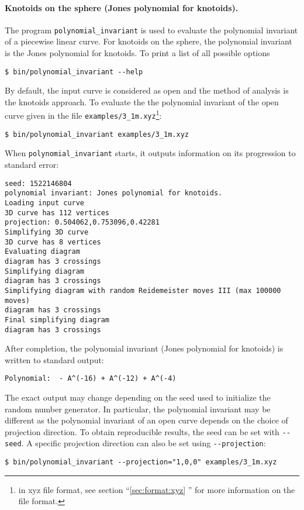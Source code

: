 \paragraph{Knotoids on the sphere (Jones polynomial for knotoids).}
The program \lstinline{polynomial_invariant} is used to evaluate the polynomial invariant of a piecewise linear curve. For knotoids on the sphere, the polynomial invariant is the Jones polynomial for knotoids. To print a list of all possible options
\begin{lstlisting}
$ bin/polynomial_invariant --help
\end{lstlisting}
By default, the input curve is considered as open and the method of analysis is the knotoids approach. To evaluate the the polynomial invariant of the open curve given in the file \lstinline{examples/3_1m.xyz}\footnote{in xyz file format, see section ``\ref{sec:format:xyz} '' for more information on the file format.}:
\begin{lstlisting}
$ bin/polynomial_invariant examples/3_1m.xyz
\end{lstlisting}
When \lstinline{polynomial_invariant} starts, it outputs information on its progression to standard error:
\begin{lstlisting}
seed: 1522146804
polynomial invariant: Jones polynomial for knotoids.
Loading input curve
3D curve has 112 vertices
projection: 0.504062,0.753096,0.42281
Simplifying 3D curve
3D curve has 8 vertices
Evaluating diagram
diagram has 3 crossings
Simplifying diagram
diagram has 3 crossings
Simplifying diagram with random Reidemeister moves III (max 100000 moves)
diagram has 3 crossings
Final simplifying diagram
diagram has 3 crossings
\end{lstlisting}
After completion, the polynomial invariant (Jones polynomial for knotoids) is written to standard output:
\begin{lstlisting}
Polynomial:  - A^(-16) + A^(-12) + A^(-4)
\end{lstlisting}
The exact output may change depending on the seed used to initialize the random number generator. In particular, the polynomial invariant may be different as the polynomial invariant of an open curve depends on the choice of projection direction. To obtain reproducible results, the seed can be set with \lstinline{--seed}. A specific projection direction can also be set using \lstinline{--projection}:
\begin{lstlisting}
$ bin/polynomial_invariant --projection="1,0,0" examples/3_1m.xyz
\end{lstlisting}

